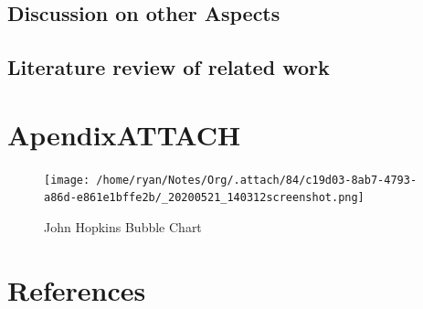 \documentclass[11pt]{article}
\begin{document}
\subsection{Discussion on other Aspects}
\label{sec:org2c67c23}
\subsection{Literature review of related work}
\label{sec:orgfc48c02}

\section{Apendix\hfill{}\textsc{ATTACH}}
\label{sec:org077d0b0}
\begin{figure}[htbp]
\centering
\texttt{[image: /home/ryan/Notes/Org/.attach/84/c19d03-8ab7-4793-a86d-e861e1bffe2b/\_20200521\_140312screenshot.png]}
\caption{\label{fig:org615a27a}John Hopkins Bubble Chart \cite{2020o}}
\end{figure}

\section{References}
\label{sec:org2fdbae4}
\label{org89765da}


\label{org655b7fa}
 
\end{document}
